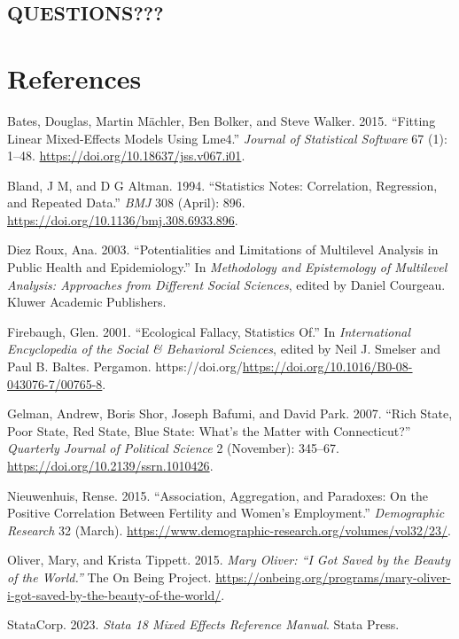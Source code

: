 \documentclass[
  letterpaper,
  DIV=11,
  numbers=noendperiod]{scrreprt}
\newlength{\cslhangindent}
\newenvironment{CSLReferences}[2] %
 {\begin{list}{}{%
  \setlength{\itemindent}{0pt}
  \setlength{\leftmargin}{0pt}
  \setlength{\parsep}{0pt}
  \ifodd #1
   \setlength{\leftmargin}{\cslhangindent}
   \setlength{\itemindent}{-1\cslhangindent}
  \fi
  \setlength{\itemsep}{#2\baselineskip}}}
 {\end{list}}
\begin{document}
\section{QUESTIONS???}\label{questions}


\chapter*{References}\label{references}


\protect{}\label{refs}
\begin{CSLReferences}{1}{1}
Bates, Douglas, Martin Mächler, Ben Bolker, and Steve Walker. 2015.
{``Fitting Linear Mixed-Effects Models Using Lme4.''} \emph{Journal of
Statistical Software} 67 (1): 1--48.
\url{https://doi.org/10.18637/jss.v067.i01}.

Bland, J M, and D G Altman. 1994. {``Statistics Notes: Correlation,
Regression, and Repeated Data.''} \emph{BMJ} 308 (April): 896.
\url{https://doi.org/10.1136/bmj.308.6933.896}.

Diez Roux, Ana. 2003. {``Potentialities and Limitations of Multilevel
Analysis in Public Health and Epidemiology.''} In \emph{Methodology and
Epistemology of Multilevel Analysis: Approaches from Different Social
Sciences}, edited by Daniel Courgeau. Kluwer Academic Publishers.

Firebaugh, Glen. 2001. {``Ecological Fallacy, Statistics Of.''} In
\emph{International Encyclopedia of the Social \& Behavioral Sciences},
edited by Neil J. Smelser and Paul B. Baltes. Pergamon.
https://doi.org/\url{https://doi.org/10.1016/B0-08-043076-7/00765-8}.

Gelman, Andrew, Boris Shor, Joseph Bafumi, and David Park. 2007. {``Rich
State, Poor State, Red State, Blue State: What's the Matter with
{C}onnecticut?''} \emph{Quarterly Journal of Political Science} 2
(November): 345--67. \url{https://doi.org/10.2139/ssrn.1010426}.

Nieuwenhuis, Rense. 2015. {``Association, Aggregation, and Paradoxes: On
the Positive Correlation Between Fertility and Women's Employment.''}
\emph{Demographic Research} 32 (March).
\url{https://www.demographic-research.org/volumes/vol32/23/}.

Oliver, Mary, and Krista Tippett. 2015. \emph{{M}ary {O}liver: {``{I}
Got Saved by the Beauty of the World.''}} The On Being Project.
\url{https://onbeing.org/programs/mary-oliver-i-got-saved-by-the-beauty-of-the-world/}.

StataCorp. 2023. \emph{Stata 18 Mixed Effects Reference Manual}. Stata
Press.

\end{CSLReferences}
\end{document}
